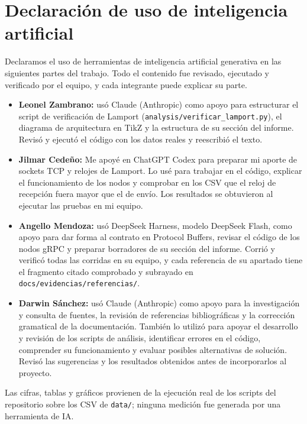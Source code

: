 \section{Declaración de uso de inteligencia artificial}

Declaramos el uso de herramientas de inteligencia artificial generativa en las
siguientes partes del trabajo. Todo el contenido fue revisado, ejecutado y
verificado por el equipo, y cada integrante puede explicar su parte.

\begin{itemize}
  \item \textbf{Leonel Zambrano:} usó Claude (Anthropic) como apoyo para
  estructurar el script de verificación de Lamport
  (\texttt{analysis/verificar\_lamport.py}), el diagrama
  de arquitectura en TikZ y la estructura de su sección del informe. Revisó y
  ejecutó el código con los datos reales y reescribió el texto.
  \item \textbf{Jilmar Cedeño:} Me apoyé en ChatGPT Codex para preparar
  mi aporte de sockets TCP y relojes de Lamport. Lo usé para trabajar en
  el código, explicar el funcionamiento de los nodos y comprobar en los
  CSV que el reloj de recepción fuera mayor que el de envío. Los resultados
  se obtuvieron al ejecutar las pruebas en mi equipo.
  \item \textbf{Angello Mendoza:} usó DeepSeek Harness, modelo DeepSeek Flash,
  como apoyo para dar forma al contrato en Protocol Buffers, revisar el código de
  los nodos gRPC y preparar borradores de su sección del informe. Corrió y
  verificó todas las corridas en su equipo, y cada referencia de su apartado
  tiene el fragmento citado comprobado y subrayado en
  \texttt{docs/evidencias/referencias/}.
  \item \textbf{Darwin Sánchez:} usó Claude (Anthropic) como apoyo para la
  investigación y consulta de fuentes, la revisión de referencias bibliográficas
  y la corrección gramatical de la documentación. También lo utilizó para apoyar
  el desarrollo y revisión de los scripts de análisis, identificar errores en
  el código, comprender su funcionamiento y evaluar posibles alternativas de
  solución. Revisó las sugerencias y los resultados obtenidos antes de
  incorporarlos al proyecto.
\end{itemize}

Las cifras, tablas y gráficos provienen de la ejecución real de los scripts
del repositorio sobre los CSV de \texttt{data/}; ninguna medición fue generada
por una herramienta de IA.
